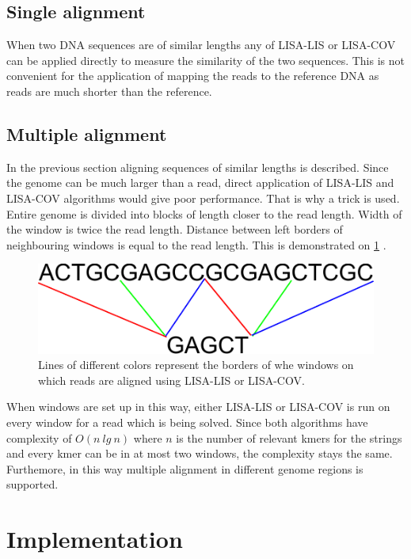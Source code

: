 \documentclass[times, utf8, diplomski]{fer}
\begin{document}
\subsection{Single alignment}

When two DNA sequences are of similar lengths any of LISA-LIS or LISA-COV can be applied directly to measure the similarity of the two sequences. This is not convenient for the application of mapping the reads to the reference DNA as reads are much shorter than the reference.

\subsection{Multiple alignment}
In the previous section aligning sequences of similar lengths is described. Since the genome can be much larger than a read, direct application of LISA-LIS and LISA-COV algorithms would give poor performance. That is why a trick is used. Entire genome is divided into blocks of length closer to the read length. Width of the window is twice the read length. Distance between left borders of neighbouring windows is equal to the read length. This is demonstrated on \ref{windowed.alignment}	.\\

\begin{figure}[H]
\centering
\includegraphics[width=1.0\textwidth]{../img/windowed-alignment.pdf}
\caption{Lines of different colors represent the borders of whe windows on which reads are aligned using LISA-LIS or LISA-COV.}\label{windowed.alignment}
\end{figure}

When windows are set up in this way, either LISA-LIS or LISA-COV is run on every window for a read which is being solved. Since both algorithms have complexity of $O(n\ lg\ n)$ where $n$ is the number of relevant kmers for the strings and every kmer can be in at most two windows, the complexity stays the same. Furthemore, in this way multiple alignment in different genome regions is supported.

\section{Implementation}
\end{document}
